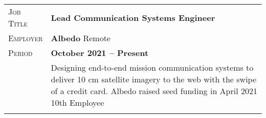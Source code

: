 \documentclass[a4paper, oneside, final]{scrartcl}
\newcommand{\gray}{\rowcolor[gray]{.90}} %
\begin{document}
\begin{center}
\begin{tabularx}{0.97\linewidth}{>{\raggedleft\scshape}p{2cm}X}
\gray Job Title & \textbf{Lead Communication Systems Engineer}\\
\gray Employer & \textbf{Albedo} \hfill Remote\\
\gray Period & \textbf{October 2021 -- Present}\\
&
\vspace{-0.15 cm}
Designing end-to-end mission communication systems to deliver 10 cm satellite imagery to the web with the swipe of a credit card.
\newline
\newline
Albedo raised seed funding in April 2021
\newline
\newline
10th Employee
\\
\\
\end{tabularx}


\end{center}
\end{document}
